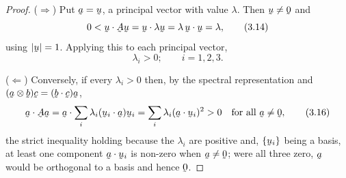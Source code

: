 \documentclass[17pt,a4paper]{extreport}
\DeclareRobustCommand{\vek}[1]{\underaccent{\tilde}{#1}}
\newcommand{\ba}{\vek{a}}
\newcommand{\bb}{\vek{b}}
\newcommand{\bc}{\vek{c}}
\newcommand{\bu}{\vek{u}}
\newcommand{\bA}{\vek{A}}
\newcommand{\bze}{\vek{0}}
\newcommand{\ip}[2]{#1\cdot#2}
\theoremstyle{scplain}
\theoremstyle{scdefn}
\begin{document}
\begin{proof}
($\Rightarrow$) Put $\ba=\bu$, a principal vector with value $\lambda$.
Then $\bu\neq\bze$ and
\begin{equation}
   0<\ip{\bu}{\bA\bu}=\ip{\bu}{\lambda\bu}=\lambda\,\ip\bu\bu=\lambda ,
   \tag{3.14}\label{eq:3.14}
\end{equation}
using $|\bu|=1$. Applying this to each principal vector,
\begin{equation}
   \lambda_{i}>0;\qquad i=1,2,3 .
   \tag{3.15}\label{eq:3.15}
\end{equation}

($\Leftarrow$) Conversely, if every $\lambda_{i}>0$ then, by the spectral
representation and $(\ba\otimes\bb)\bc=(\ip\bb\bc)\ba$,
\begin{equation}
   \ip{\ba}{\bA\ba}
   =\ip{\ba}{\sum_{i}\lambda_{i}(\ip{\bu_{i}}{\ba})\bu_{i}}
   =\sum_{i}\lambda_{i}(\ip{\ba}{\bu_{i}})^{2}>0
   \quad\text{for all }\ba\neq\bze ,
   \tag{3.16}\label{eq:3.16}
\end{equation}
the strict inequality holding because the $\lambda_{i}$ are positive and,
$\{\bu_{i}\}$ being a basis, at least one component $\ip{\ba}{\bu_{i}}$ is
non-zero when $\ba\neq\bze$; were all three zero, $\ba$ would be
orthogonal to a basis and hence $\bze$.


\end{proof}
\end{document}
